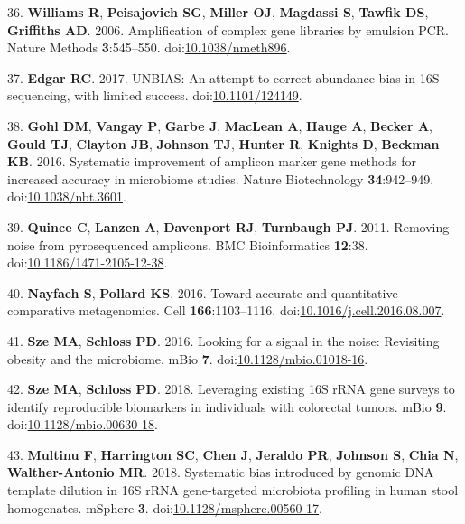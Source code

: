 \documentclass[11pt,]{article}
\begin{document}
\leavevmode\hypertarget{ref-Williams2006}{}%
36. \textbf{Williams R}, \textbf{Peisajovich SG}, \textbf{Miller OJ},
\textbf{Magdassi S}, \textbf{Tawfik DS}, \textbf{Griffiths AD}. 2006.
Amplification of complex gene libraries by emulsion PCR. Nature Methods
\textbf{3}:545--550.
doi:\href{https://doi.org/10.1038/nmeth896}{10.1038/nmeth896}.

\leavevmode\hypertarget{ref-Edgar2017}{}%
37. \textbf{Edgar RC}. 2017. UNBIAS: An attempt to correct abundance
bias in 16S sequencing, with limited success.
doi:\href{https://doi.org/10.1101/124149}{10.1101/124149}.

\leavevmode\hypertarget{ref-Gohl2016}{}%
38. \textbf{Gohl DM}, \textbf{Vangay P}, \textbf{Garbe J},
\textbf{MacLean A}, \textbf{Hauge A}, \textbf{Becker A}, \textbf{Gould
TJ}, \textbf{Clayton JB}, \textbf{Johnson TJ}, \textbf{Hunter R},
\textbf{Knights D}, \textbf{Beckman KB}. 2016. Systematic improvement of
amplicon marker gene methods for increased accuracy in microbiome
studies. Nature Biotechnology \textbf{34}:942--949.
doi:\href{https://doi.org/10.1038/nbt.3601}{10.1038/nbt.3601}.

\leavevmode\hypertarget{ref-Quince2011}{}%
39. \textbf{Quince C}, \textbf{Lanzen A}, \textbf{Davenport RJ},
\textbf{Turnbaugh PJ}. 2011. Removing noise from pyrosequenced
amplicons. BMC Bioinformatics \textbf{12}:38.
doi:\href{https://doi.org/10.1186/1471-2105-12-38}{10.1186/1471-2105-12-38}.

\leavevmode\hypertarget{ref-Nayfach2016}{}%
40. \textbf{Nayfach S}, \textbf{Pollard KS}. 2016. Toward accurate and
quantitative comparative metagenomics. Cell \textbf{166}:1103--1116.
doi:\href{https://doi.org/10.1016/j.cell.2016.08.007}{10.1016/j.cell.2016.08.007}.

\leavevmode\hypertarget{ref-Sze2016}{}%
41. \textbf{Sze MA}, \textbf{Schloss PD}. 2016. Looking for a signal in
the noise: Revisiting obesity and the microbiome. mBio \textbf{7}.
doi:\href{https://doi.org/10.1128/mbio.01018-16}{10.1128/mbio.01018-16}.

\leavevmode\hypertarget{ref-Sze2018}{}%
42. \textbf{Sze MA}, \textbf{Schloss PD}. 2018. Leveraging existing 16S
rRNA gene surveys to identify reproducible biomarkers in individuals
with colorectal tumors. mBio \textbf{9}.
doi:\href{https://doi.org/10.1128/mbio.00630-18}{10.1128/mbio.00630-18}.

\leavevmode\hypertarget{ref-Multinu2018}{}%
43. \textbf{Multinu F}, \textbf{Harrington SC}, \textbf{Chen J},
\textbf{Jeraldo PR}, \textbf{Johnson S}, \textbf{Chia N},
\textbf{Walther-Antonio MR}. 2018. Systematic bias introduced by genomic
DNA template dilution in 16S rRNA gene-targeted microbiota profiling in
human stool homogenates. mSphere \textbf{3}.
doi:\href{https://doi.org/10.1128/msphere.00560-17}{10.1128/msphere.00560-17}.
\end{document}
